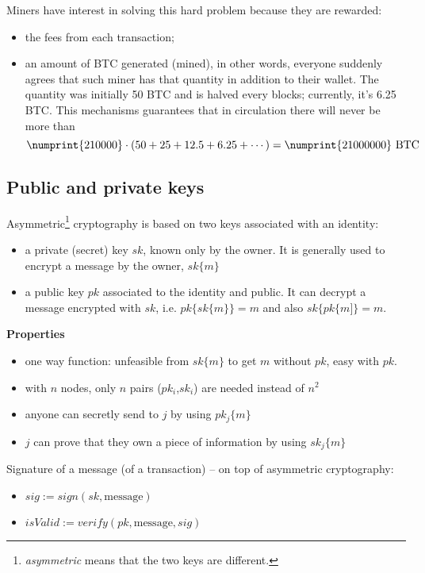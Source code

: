 Miners have interest in solving this hard problem because they are rewarded:
\begin{itemize}
	\item the fees from each transaction;
	\item an amount of BTC generated (mined), in other words, everyone suddenly agrees that such miner has that quantity in addition to their wallet. The quantity was initially 50 BTC and is halved every  blocks; currently, it's 6.25 BTC. This mechanisms guarantees that in circulation there will never be more than
	\begin{equation*}
		\numprint{210000} \cdot (50+25+12.5+6.25+\cdots) = \numprint{21000000}\ \text{BTC}
	\end{equation*}
\end{itemize}

\subsection{Public and private keys}

Asymmetric\footnote{\textit{asymmetric} means that the two keys are different.} cryptography is based on two keys associated with an identity:
\begin{itemize}
	\item a private (secret) key $sk$, known only by the owner. It is generally used to encrypt a message by the owner, $sk\{m\}$
	\item a public key $pk$ associated to the identity and public. It can decrypt a message encrypted with $sk$, i.e. $pk\{sk\{m\}\} =m$ and also $sk\{pk\{m]\} =m$.
\end{itemize}

\textbf{Properties}
\begin{itemize}
	\item one way function: unfeasible from $sk\{m\}$ to get $m$ without $pk$, easy with $pk$.
	\item with $n$ nodes, only $n$ pairs ($pk_{i}$,$sk_{i}$) are needed instead of $n^{2}$
	\item anyone can secretly send to $j$ by using $pk_{j}\{m\}$
	\item $j$ can prove that they own a piece of information by using $sk_{j}\{m\}$
\end{itemize}

Signature of a message (of a transaction) – on top of asymmetric cryptography:
\begin{itemize}
	\item $sig:=sign(sk,\text{message})$
	\item $isValid:=verify(pk,\text{message},sig)$
\end{itemize}

